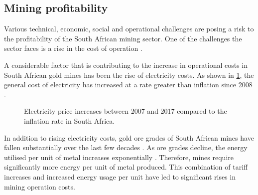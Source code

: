 	\subsection{Mining profitability}
	 	Various technical, economic, social and operational challenges are posing a risk to the profitability of the South African mining sector. One of the challenges the sector faces is a rise in the cost of operation \cite{neingo2016trends}.
	 	\par
		A considerable factor that is contributing to the increase in operational costs in South African gold mines has been the rise of electricity costs. As shown in \cref{fig: Eskom tariffs}, the general cost of electricity has increased at a rate greater than inflation since 2008 \cite{Eskom2013Tariffs}.
		\begin{figure}[h]
			\centering
			\fbox{}
			\caption[Electricity price increases between 2007 and 2017 compared to the inflation rate in South Africa..]{Electricity price increases between 2007 and 2017 \cite{Eskom2013Tariffs} compared to the inflation rate in South Africa\protect\footnotemark[1]. }
			\label{fig: Eskom tariffs}
		\end{figure}
		\par
		In addition to rising electricity costs, gold ore grades of South African mines have fallen substantially over the last few decades \cite{mudd2007global}. As ore grades decline, the energy utilised per unit of metal increases exponentially \cite{muller2010numerical}. Therefore, mines require significantly more energy per unit of metal produced. This combination of tariff increases and increased energy usage per unit have led to significant rises in mining operation costs.
